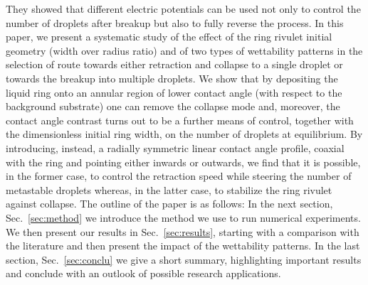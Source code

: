\documentclass[twoside,twocolumn,9pt]{article}
\begin{document}
They showed that different electric potentials can be used not only to control the number of droplets after breakup but also to fully reverse the process.
In this paper, we present a systematic study of the effect of the ring rivulet initial geometry (width over radius ratio) and of two types of wettability patterns in the selection of route towards either retraction and collapse to a single droplet or towards the breakup into multiple droplets. 
We show that by depositing the liquid ring onto an annular region of lower contact angle (with respect to the background substrate) one can remove the collapse mode and, moreover, the contact angle contrast turns out to be a further means of control, together with the dimensionless initial ring width, on the number of droplets at equilibrium.
By introducing, instead, a radially symmetric linear contact angle profile, coaxial with the ring and pointing either inwards or outwards, we find that it is possible, in the former case, to control the retraction speed while steering the number of metastable droplets whereas, in the latter case, to stabilize the ring rivulet against collapse.
The outline of the paper is as follows: In the next section, Sec.~\ref{sec:method} we introduce the method we use to run numerical experiments.
We then present our results in Sec.~\ref{sec:results}, starting with a comparison with the literature and then present the impact of the wettability patterns.
In the last section, Sec.~\ref{sec:conclu} we give a short summary, highlighting important results and conclude with an outlook of possible research applications.
\end{document}
